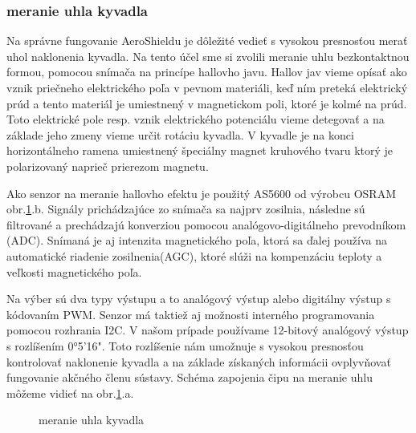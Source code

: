 \subsubsection{meranie uhla kyvadla}
\label{meruhl}

Na správne fungovanie AeroShieldu je dôležité vedieť s vysokou presnosťou merať uhol naklonenia kyvadla. Na tento účel sme si zvolili meranie uhlu bezkontaktnou formou, pomocou snímača na princípe hallovho javu. Hallov jav vieme opísať ako vznik priečneho elektrického poľa v pevnom materiáli, keď ním preteká elektrický prúd a tento materiál je umiestnený v magnetickom poli, ktoré je kolmé na prúd\cite{Hall}. Toto elektrické pole resp. vznik elektrického potenciálu vieme detegovať a na základe jeho zmeny vieme určit rotáciu kyvadla. V kyvadle je na konci horizontálneho ramena umiestnený špeciálny magnet kruhového tvaru ktorý je polarizovaný naprieč prierezom magnetu.

Ako senzor na meranie hallovho efektu je použitý AS5600 od výrobcu OSRAM obr.\ref{OBRAZOK 2.2}.b. Signály prichádzajúce zo snímača sa najprv zosilnia, následne sú filtrované a prechádzajú konverziou pomocou analógovo-digitálneho prevodníkom (ADC). Snímaná je aj intenzita magnetického poľa, ktorá sa ďalej používa na
automatické riadenie zosilnenia(AGC), ktoré slúži na kompenzáciu teploty a veľkosti magnetického poľa.

Na výber sú dva typy výstupu a to analógový výstup alebo digitálny výstup s kódovaním PWM. Senzor má taktiež aj možnosti interného programovania pomocou rozhrania I2C.
V našom prípade používame 12-bitový analógový výstup s rozlíšením 0°5'16". Toto rozlíšenie nám umožnuje s vysokou presnosťou kontrolovať naklonenie kyvadla a na základe získaných informácii ovplyvňovať fungovanie akčného členu sústavy. Schéma zapojenia čipu na meranie uhlu môžeme vidieť na obr.\ref{OBRAZOK 2.2}.a.



\begin{figure}[!tbh]
\hfill
{}
\hfill
{}
\hfill
\caption{meranie uhla kyvadla}\label{OBRAZOK 2.2}
\end{figure}

